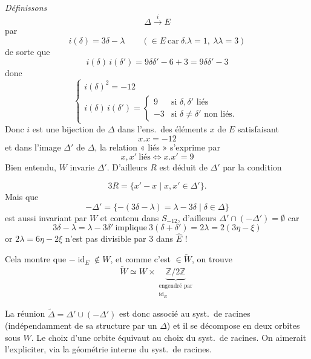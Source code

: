 \documentclass[11pt,a4paper]{article}
\begin{document}
\emph{Définissons}
\[
\Delta \xrightarrow{\ i\ } E
\]
par
\[
i(\delta) = 3\delta - \lambda \qquad (\in E \ \text{car} \ \delta.\lambda = 1, \ \lambda\lambda = 3)
\]
de sorte que 
\[
i(\delta)\, i(\delta') = 9\delta\delta' - 6 + 3 = 9\delta\delta' - 3
\]
donc
\[
\begin{cases}
i(\delta)^2 = -12 \\
i(\delta)\, i(\delta') = \begin{cases} 9 & \text{si } \delta, \delta' \text{ liés} \\ -3 & \text{si } \delta \neq \delta' \text{ non liés.} \end{cases}
\end{cases}
\]
Donc $i$ est une bijection de $\Delta$ dans 
l'ens.\ des  éléments $x$ de $E$ satisfaisant
\[
x . x = -12
\]
et dans l'image $\Delta'$ de $\Delta$, \struck{\ill{}} la relation « liés »
s'exprime par
\[
x, x' \ \text{liés} \iff x . x' = 9
\]
Bien entendu, $W$ invarie $\Delta'$. \struck{\ill{}} D'ailleurs $R$ est
déduit de $\Delta'$  par la condition
\uncertain{\ill{}}

\[
3R = \lbrace x' - x \mid x, x' \in \Delta' \rbrace .
\]
Mais    que
\[
-\Delta' = \lbrace -(3\delta - \lambda) = \lambda - 3\delta \mid \delta \in \Delta \rbrace
\]
est aussi invariant par $W$ et contenu dans $S_{-12}$, d'ailleurs
\struck{\ill{}} $\Delta' \cap (-\Delta') = \emptyset$ car
\[
3\delta - \lambda = \lambda - 3\delta' \ \text{implique} \ 3(\delta + \delta') = 2\lambda = 2(3\eta - \xi)
\]
or $2\lambda = 6\eta - 2\xi$ n'est pas divisible par $3$ dans
$\widehat{E}$ !

 Cela montre  que $-\operatorname{id}_E
\notin W$, et comme c'est $\in \widetilde{W}$, on trouve
\[
\widetilde{W} \simeq W \times \underbrace{\mathbb{Z}/2\mathbb{Z}}_{\substack{\text{engendré par} \\ \operatorname{id}_E}}
\]

\struck{\ill{}} La réunion $\widetilde{\Delta} = \Delta' \cup (-\Delta')$
est donc   associé au syst.\ de racines
(indépendamment de sa structure par un $\Delta$) et il se décompose en deux
orbites sous $W$. Le choix d'une orbite équivaut au choix du syst.\ de
racines. On aimerait l'expliciter,  via
la géométrie interne du syst.\ de racines.
\end{document}
